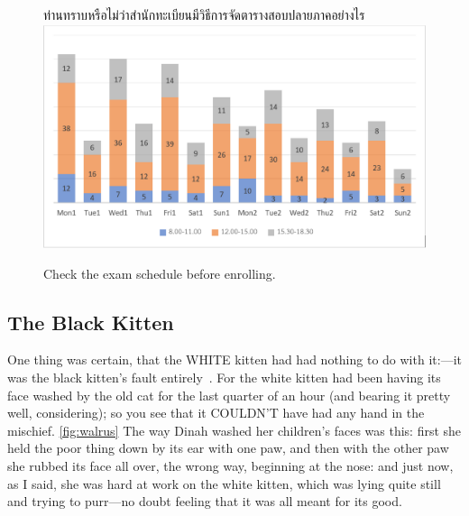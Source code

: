 \begin{figure}
\begin{center}
ท่านทราบหรือไม่ว่าสำนักทะเบียนมีวิธีการจัดตารางสอบปลายภาคอย่างไร
\includegraphics[width=\linewidth]{bar_chart.png}
\end{center}
\caption[Poem]{Check the exam schedule before enrolling.}
\label{fig:enroll}     
\end{figure}

\subsection{The Black Kitten}
  One thing was certain, that the WHITE kitten had had nothing to
do with it:---it was the black kitten's fault entirely~\cite{aiw}.  For the
white kitten had been having its face washed by the old cat for
the last quarter of an hour (and bearing it pretty well,
considering); so you see that it COULDN'T have had any hand in
the mischief.
\ref{fig:walrus}
  The way Dinah washed her children's faces was this:  first she
held the poor thing down by its ear with one paw, and then with
the other paw she rubbed its face all over, the wrong way,
beginning at the nose:  and just now, as I said, she was hard at
work on the white kitten, which was lying quite still and trying
to purr---no doubt feeling that it was all meant for its good.

  